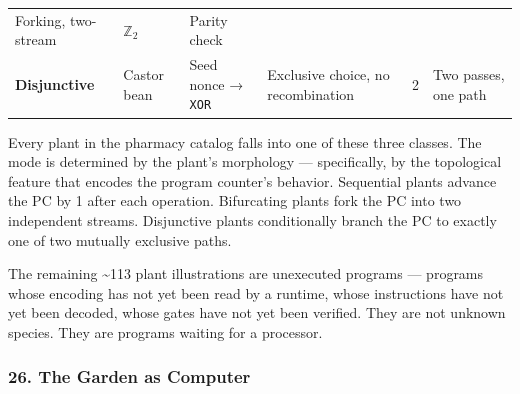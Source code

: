 \begin{longtable}[]{@{}llllll@{}}
\begin{minipage}[t]{0.16\columnwidth}
Forking, two-stream\strut
\end{minipage} & \begin{minipage}[t]{0.16\columnwidth}\raggedright
\(\mathbb{Z}_2\)\strut
\end{minipage} & \begin{minipage}[t]{0.13\columnwidth}\raggedright
Parity check\strut
\end{minipage}\tabularnewline
\begin{minipage}[t]{0.09\columnwidth}\raggedright
\textbf{Disjunctive}\strut
\end{minipage} & \begin{minipage}[t]{0.14\columnwidth}\raggedright
Castor bean\strut
\end{minipage} & \begin{minipage}[t]{0.16\columnwidth}\raggedright
Seed nonce → \texttt{XOR}\strut
\end{minipage} & \begin{minipage}[t]{0.16\columnwidth}\raggedright
Exclusive choice, no recombination\strut
\end{minipage} & \begin{minipage}[t]{0.16\columnwidth}\raggedright
2\strut
\end{minipage} & \begin{minipage}[t]{0.13\columnwidth}\raggedright
Two passes, one path\strut
\end{minipage}\tabularnewline
\bottomrule
\end{longtable}

Every plant in the pharmacy catalog falls into one of these three
classes. The mode is determined by the plant's morphology ---
specifically, by the topological feature that encodes the program
counter's behavior. Sequential plants advance the PC by 1 after each
operation. Bifurcating plants fork the PC into two independent streams.
Disjunctive plants conditionally branch the PC to exactly one of two
mutually exclusive paths.

The remaining \textasciitilde113 plant illustrations are unexecuted
programs --- programs whose encoding has not yet been read by a runtime,
whose instructions have not yet been decoded, whose gates have not yet
been verified. They are not unknown species. They are programs waiting
for a processor.

\hypertarget{the-garden-as-computer}{%
\subsubsection{26. The Garden as
Computer}\label{the-garden-as-computer}}

